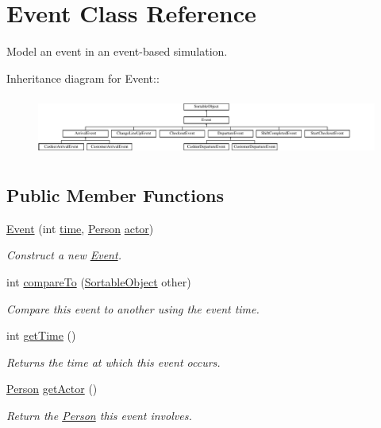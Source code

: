 \hypertarget{class_event}{
\section{Event Class Reference}
\label{class_event}
}
Model an event in an event-based simulation.  


Inheritance diagram for Event::\begin{figure}[H]
\begin{center}
\leavevmode
\includegraphics[height=1.97531cm]{class_event}
\end{center}
\end{figure}
\subsection*{Public Member Functions}
\begin{CompactItemize}
\item 
\hyperlink{class_event_2561c2efeea27bff2bbda6c6dd33aea3}{Event} (int \hyperlink{class_event_d4c0fbb00c3fd993405df98bafcd52c5}{time}, \hyperlink{class_person}{Person} \hyperlink{class_event_28f906bdfa717a32d605aedde772d530}{actor})
\begin{CompactList}\small\item\em Construct a new \hyperlink{class_event}{Event}. \item\end{CompactList}\item 
int \hyperlink{class_event_6ef202b20715ab70bcfc052e64f1094b}{compareTo} (\hyperlink{class_sortable_object}{SortableObject} other)
\begin{CompactList}\small\item\em Compare this event to another using the event time. \item\end{CompactList}\item 
\hypertarget{class_event_b59bcdd2fe17bf7652bc503f5f537297}{
int \hyperlink{class_event_b59bcdd2fe17bf7652bc503f5f537297}{getTime} ()}
\label{class_event_b59bcdd2fe17bf7652bc503f5f537297}

\begin{CompactList}\small\item\em Returns the time at which this event occurs. \item\end{CompactList}\item 
\hypertarget{class_event_6f8cd987ea0030c2de017324405580fe}{
\hyperlink{class_person}{Person} \hyperlink{class_event_6f8cd987ea0030c2de017324405580fe}{getActor} ()}
\label{class_event_6f8cd987ea0030c2de017324405580fe}

\begin{CompactList}\small\item\em Return the \hyperlink{class_person}{Person} this event involves. \item\end{CompactList}\end{CompactItemize}
